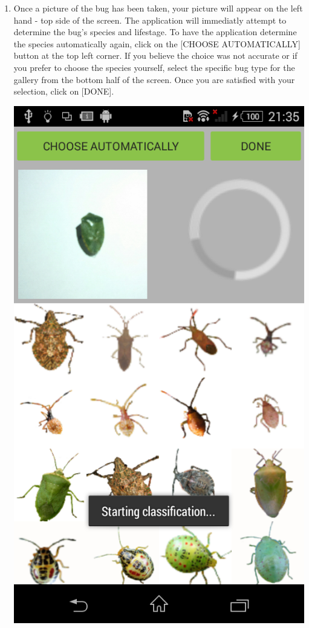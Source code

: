 \documentclass[11pt,a4paper,titlepage]{article}
\begin{document}
\begin{enumerate}
	\item Once a picture of the bug has been taken, your picture will appear on the left hand - top side of the screen. The application will immediatly attempt to determine the bug's species and lifestage. To have the application determine the species automatically again, click on the [CHOOSE AUTOMATICALLY] button at the top left corner. If you believe the choice was not accurate or if you prefer to choose the species yourself, select the specific bug type for the gallery from the bottom half of the screen. Once you are satisfied with your selection, click on [DONE].
	\begin{center}
				\includegraphics[scale=0.3]{identiftyclassifystart}
			\end{center}


\end{enumerate}
\end{document}
